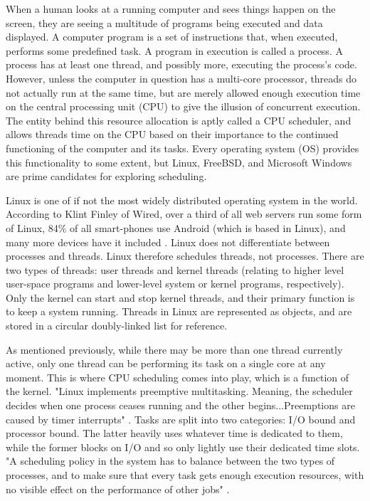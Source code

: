 \documentclass[10pt,draftclsnofoot,onecolumn]{IEEEtran}
\begin{document}
    When a human looks at a running computer and sees things happen on the screen, they are seeing a multitude of programs being executed and data displayed. A computer program is a set of instructions that, when executed, performs some predefined task. A program in execution is called a process. A process has at least one thread, and possibly more, executing the process's code. However, unless the computer in question has a multi-core processor, threads do not actually run at the same time, but are merely allowed enough execution time on the central processing unit (CPU) to give the illusion of concurrent execution. The entity behind this resource allocation is aptly called a CPU scheduler, and allows threads time on the CPU based on their importance to the continued functioning of the computer and its tasks. Every operating system (OS) provides this functionality to some extent, but Linux, FreeBSD, and Microsoft Windows are prime candidates for exploring scheduling.\par
    Linux is one of if not the most widely distributed operating system in the world. According to Klint Finley of Wired, over a third of all web servers run some form of Linux, 84\% of all smart-phones use Android (which is based in Linux), and many more devices have it included \cite{finley_2017}. Linux does not differentiate between processes and threads. Linux therefore schedules threads, not processes. There are two types of threads: user threads and kernel threads (relating to higher level user-space programs and lower-level system or kernel programs, respectively). Only the kernel can start and stop kernel threads, and their primary function is to keep a system running. Threads in Linux are represented as objects, and are stored in a circular doubly-linked list for reference.\par
    As mentioned previously, while there may be more than one thread currently active, only one thread can be performing its task on a single core at any moment. This is where CPU scheduling comes into play, which is a function of the kernel. "Linux implements preemptive multitasking. Meaning, the scheduler decides when one process ceases running and the other begins...Preemptions are caused by timer interrupts" \cite{Ishkov_2015}. Tasks are split into two categories: I/O bound and processor bound. The latter heavily uses whatever time is dedicated to them, while the former blocks on I/O and so only lightly use their dedicated time slots. "A scheduling policy in the system has to balance between the two types of processes, and to make sure that every task gets enough execution resources, with no visible effect on the performance of other jobs" \cite{Ishkov_2015}.\par
\end{document}
